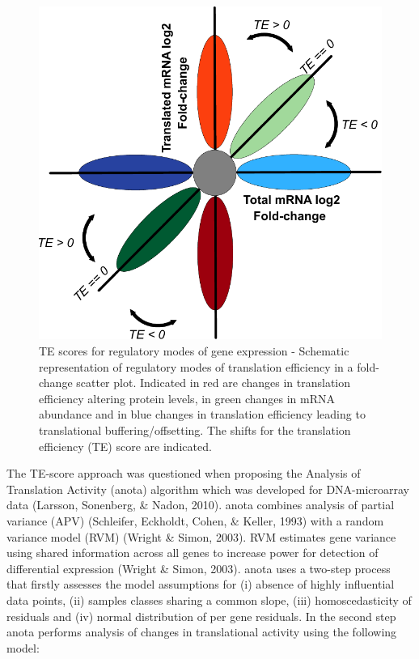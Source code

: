 \documentclass[
  12pt,
  openany]{book}
\begin{document}
\begin{figure}
  \includegraphics{./figures/geneModes_TE.pdf}
  \caption{TE scores for regulatory modes of gene expression -  Schematic representation of regulatory modes of translation efficiency in a fold-change scatter plot. Indicated in red are changes in translation efficiency altering protein levels, in green changes in mRNA abundance and in blue changes in translation efficiency leading to translational buffering/offsetting. The shifts for the translation efficiency (TE) score are indicated. \label{fig:TE}}
\end{figure}

The TE-score approach was questioned when proposing the Analysis of Translation Activity (anota) algorithm which was developed for DNA-microarray data (Larsson, Sonenberg, \& Nadon, 2010). anota combines analysis of partial variance (APV) (Schleifer, Eckholdt, Cohen, \& Keller, 1993) with a random variance model (RVM) (Wright \& Simon, 2003). RVM estimates gene variance using shared information across all genes to increase power for detection of differential expression (Wright \& Simon, 2003). anota uses a two-step process that firstly assesses the model assumptions for (i) absence of highly influential data points, (ii) samples classes sharing a common slope, (iii) homoscedasticity of residuals and (iv) normal distribution of per gene residuals. In the second step anota performs analysis of changes in translational activity using the following model:
\end{document}
